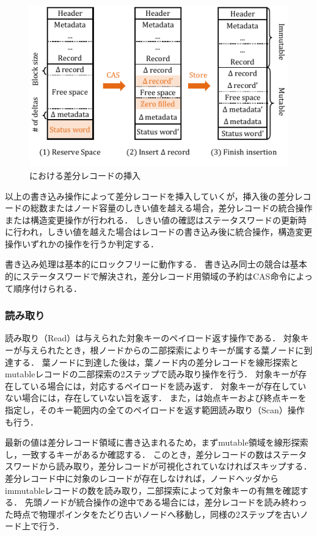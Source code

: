 \begin{figure}[t]
    \centering
    \includegraphics{./figures/Bc-insertion.pdf}
    \caption{\Bctree{}における差分レコードの挿入}
    \label{fig:bc_tree_insertion}
\end{figure}

以上の書き込み操作によって差分レコードを挿入していくが，挿入後の差分レコードの総数またはノード容量のしきい値を越える場合，差分レコードの統合操作または構造変更操作が行われる．
しきい値の確認はステータスワードの更新時に行われ，しきい値を越えた場合はレコードの書き込み後に統合操作，構造変更操作いずれかの操作を行うか判定する．

書き込み処理は基本的にロックフリーに動作する．
書き込み同士の競合は基本的にステータスワードで解決され，差分レコード用領域の予約はCAS命令によって順序付けられる．

\subsubsection{読み取り}

読み取り（Read）は与えられた対象キーのペイロード返す操作である．
対象キーが与えられたとき，根ノードからの二部探索によりキーが属する葉ノードに到達する．
葉ノードに到達した後は，葉ノード内の差分レコードを線形探索とmutableレコードの二部探索の2ステップで読み取り操作を行う．
対象キーが存在している場合には，対応するペイロードを読み返す．
対象キーが存在していない場合には，存在していない旨を返す．
また，\Bctree{}は始点キーおよび終点キーを指定し，そのキー範囲内の全てのペイロードを返す範囲読み取り（Scan）操作も行う．

最新の値は差分レコード領域に書き込まれるため，まずmutable領域を線形探索し，一致するキーがあるか確認する．
このとき，差分レコードの数はステータスワードから読み取り，差分レコードが可視化されていなければスキップする．
差分レコード中に対象のレコードが存在しなければ，ノードヘッダからimmutableレコードの数を読み取り，二部探索によって対象キーの有無を確認する．
先頭ノードが統合操作の途中である場合には，差分レコードを読み終わった時点で物理ポインタをたどり古いノードへ移動し，同様の2ステップを古いノード上で行う．

